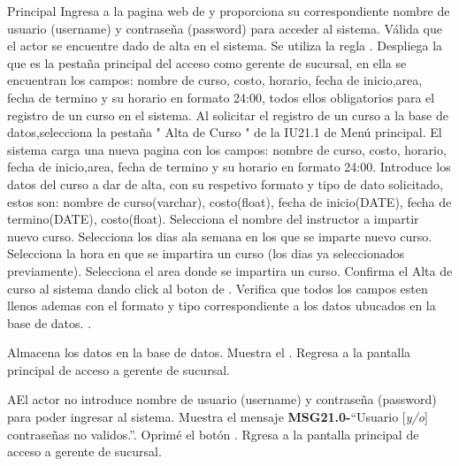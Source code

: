 	\begin{UCtrayectoria}{Principal}
	\UCpaso[\UCactor] Ingresa a la pagina web de \label{CU21.0Login} y proporciona su correspondiente nombre de usuario (username) y contraseña (password) para acceder al sistema. %
		\UCpaso Válida que el actor se encuentre dado de alta en el sistema. Se utiliza la regla  .
		\UCpaso Despliega la  que es la pestaña principal del acceso como gerente de sucursal, en ella se encuentran los campos: nombre de curso, costo, horario, fecha de inicio,area, fecha de termino y su  horario en formato 24:00, todos ellos obligatorios para el registro de un curso en el sistema.
	\UCpaso[\UCactor] Al solicitar el registro de un curso a la base de datos,selecciona la pestaña " Alta de Curso  " de la IU21.1 de Menú principal. %
	\UCpaso El sistema carga una nueva pagina con los campos: nombre de curso, costo, horario, fecha de inicio,area, fecha de termino y su  horario en formato 24:00.
	\UCpaso[\UCactor] Introduce los datos del curso a dar de alta, con su respetivo formato y tipo de dato solicitado, estos son: nombre de curso(varchar), costo(float), fecha de inicio(DATE), fecha de termino(DATE), costo(float).
    \UCpaso[\UCactor] Selecciona el nombre del instructor a impartir nuevo curso.
	\UCpaso[\UCactor] Selecciona los dias ala semana en los que se imparte nuevo curso.
	\UCpaso[\UCactor] Selecciona la hora en que se impartira un curso (los dias ya seleccionados previamente).
	\UCpaso[\UCactor] Selecciona el area donde se impartira un curso.
	\UCpaso[\UCactor] Confirma el Alta de curso al sistema dando click al boton  de \label{IU21.1 Alta Curso}.
	\UCpaso Verifica que todos los campos esten llenos ademas con el formato y tipo correspondiente a los datos ubucados en la base de datos.  .
		
		\UCpaso Almacena los datos en la base de datos. %
		\UCpaso Muestra el .
		\UCpaso Regresa a la pantalla principal de acceso a gerente de sucursal.
\end{UCtrayectoria}

\begin{UCtrayectoriaA}{A}{El actor no introduce nombre de usuario (username) y contraseña (password) para poder ingresar al sistema.}
			\UCpaso Muestra el mensaje {\bf MSG21.0-}``Usuario [{\em y/o}] contraseñas no validos.''.
			\UCpaso[\UCactor] Oprimé el botón .
			\UCpaso Rgresa a la pantalla principal de acceso a gerente de sucursal.
		\end{UCtrayectoriaA}

